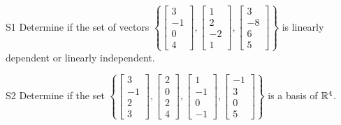 \documentclass{sbgLAsemi}
\begin{document}
\begin{problem}{S1}
Determine if the set of vectors $\left\{\begin{bmatrix} 3 \\ -1 \\ 0 \\ 4 \end{bmatrix}, \begin{bmatrix} 1  \\ 2 \\ -2 \\ 1 \end{bmatrix}, \begin{bmatrix} 3 \\ -8 \\ 6 \\ 5 \end{bmatrix} \right\}$  is linearly dependent or linearly independent.
\end{problem}

\begin{problem}{S2}
  Determine if the set \(\left\{
    \begin{bmatrix} 3 \\ -1 \\ 2 \\3 \end{bmatrix},
    \begin{bmatrix} 2 \\ 0 \\ 2 \\ 4\end{bmatrix},
    \begin{bmatrix} 1 \\ -1 \\ 0 \\ -1\end{bmatrix},
    \begin{bmatrix} -1 \\ 3 \\ 0 \\ 5\end{bmatrix}
  \right\}\) is a basis of $\mathbb{R}^4$.
\end{problem}
\end{document}
